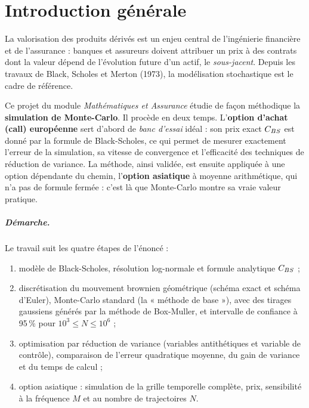 \chapter*{Introduction générale}

La valorisation des produits dérivés est un enjeu central de l'ingénierie financière et de l'assurance : banques et assureurs doivent attribuer un prix à des contrats dont la valeur dépend de l'évolution future d'un actif, le \emph{sous-jacent}. Depuis les travaux de Black, Scholes et Merton (1973), la modélisation stochastique est le cadre de référence.

Ce projet du module \emph{Mathématiques et Assurance} étudie de façon méthodique la \textbf{simulation de Monte-Carlo}. Il procède en deux temps. L'\textbf{option d'achat (call) européenne} sert d'abord de \emph{banc d'essai} idéal : son prix exact $C_{BS}$ est donné par la formule de Black-Scholes, ce qui permet de mesurer exactement l'erreur de la simulation, sa vitesse de convergence et l'efficacité des techniques de réduction de variance. La méthode, ainsi validée, est ensuite appliquée à une option dépendante du chemin, l'\textbf{option asiatique} à moyenne arithmétique, qui n'a pas de formule fermée : c'est là que Monte-Carlo montre sa vraie valeur pratique.

\paragraph{Démarche.} Le travail suit les quatre étapes de l'énoncé :
\begin{enumerate}[nosep]
  \item modèle de Black-Scholes, résolution log-normale et formule analytique $C_{BS}$ ;
  \item discrétisation du mouvement brownien géométrique (schéma exact et schéma d'Euler), Monte-Carlo standard (la « méthode de base »), avec des tirages gaussiens générés par la méthode de Box-Muller, et intervalle de confiance à 95\,\% pour $10^3\le N\le 10^6$ ;
  \item optimisation par réduction de variance (variables antithétiques et variable de contrôle), comparaison de l'erreur quadratique moyenne, du gain de variance et du temps de calcul ;
  \item option asiatique : simulation de la grille temporelle complète, prix, sensibilité à la fréquence $M$ et au nombre de trajectoires $N$.
\end{enumerate}

